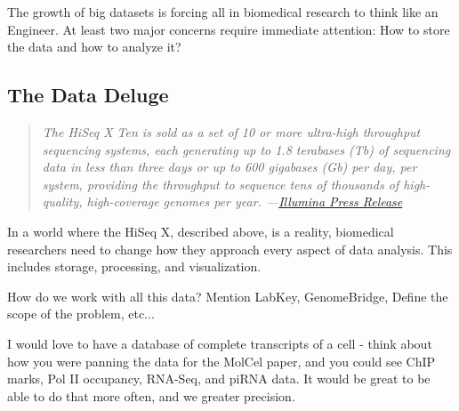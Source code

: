     The growth of big datasets is forcing all in biomedical research to think like an Engineer. At least two major concerns require immediate attention: How to store the data and how to analyze it?

  \subsection{The Data Deluge}
    \label{Disc:subsec:Dealing with Data Deluge}

    \begin{quote}
      \itshape
      \singlespacing
      The HiSeq X Ten is sold as a set of 10 or more ultra-high throughput sequencing systems, each generating up to 1.8 terabases (Tb) of sequencing data in less than three days or up to 600 gigabases (Gb) per day, per system, providing the throughput to sequence tens of thousands of high-quality, high-coverage genomes per year. ---\href{http://bit.ly/PZpegZ}{Illumina Press Release}
      \end{quote}

    In a world where the HiSeq X, described above, is a reality, biomedical researchers need to change how they approach every aspect of data analysis. This includes storage, processing, and visualization. 

    How do we work with all this data? Mention LabKey, GenomeBridge, Define the scope of the problem, etc...

    I would love to have a database of complete transcripts of a cell - think about how you were panning the data for the MolCel paper, and you could see ChIP marks, Pol II occupancy, RNA-Seq, and piRNA data. It would be great to be able to do that more often, and we greater precision.





